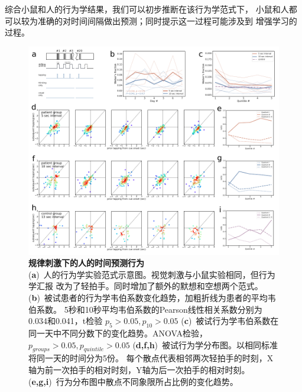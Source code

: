 综合小鼠和人的行为学结果，我们可以初步推断在该行为学范式下，
小鼠和人都可以较为准确的对时间间隔做出预测；同时提示这一过程可能涉及到
增强学习的过程。

\begin{figure}[hp]
    \centering
    \includegraphics[width=\textwidth]{src/figures/human_behavior.pdf}
    \caption{\textbf{规律刺激下的人的时间预测行为}\\
    (\textbf{a})~人的行为学实验范式示意图。视觉刺激与小鼠实验相同，但行为学汇报
    改为了轻拍手。同时增加了额外的默想和空想两个范式。
    (\textbf{b})~被试患者的行为学韦伯系数变化趋势，加粗折线为患者的平均韦伯系数。
    5秒和10秒平均韦伯系数的Pearson线性相关系数分别为0.034和0.041，t检验 $p_5 > 0.05, p_{10} > 0.05$
    (\textbf{c})~被试行为学韦伯系数在同一天中不同分数下的变化趋势。ANOVA检验，$p_{groups} > 0.05, p_{quintile} > 0.05$
    (\textbf{d,f,h})~被试行为学分布图。以相同标准将同一天的时间分为5份。
    每个散点代表相邻两次轻拍手的时刻，X轴为前一次拍手的相对时刻，Y轴为后一次拍手的相对时刻。
    (\textbf{e,g,i})~行为分布图中散点不同象限所占比例的变化趋势。}
    \label{fig:human_behavior}
\end{figure}





